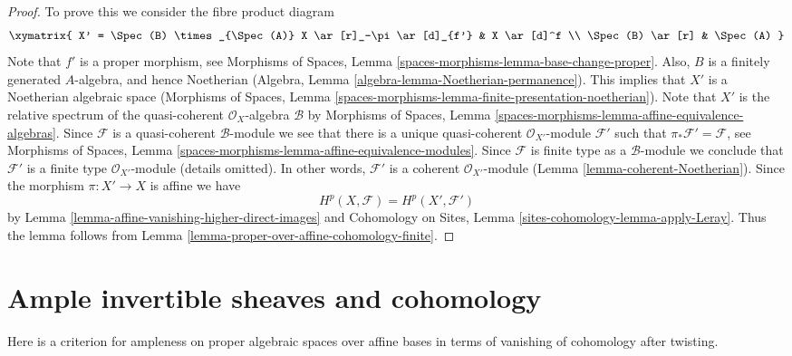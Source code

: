 \begin{proof}
To prove this we consider the fibre product diagram
$$
\xymatrix{
X' = \Spec(B) \times_{\Spec(A)} X
\ar[r]_-\pi \ar[d]_{f'} &
X \ar[d]^f \\
\Spec(B) \ar[r] &
\Spec(A)
}
$$
Note that $f'$ is a proper morphism, see
Morphisms of Spaces, Lemma \ref{spaces-morphisms-lemma-base-change-proper}.
Also, $B$ is a finitely generated $A$-algebra, and hence
Noetherian (Algebra, Lemma \ref{algebra-lemma-Noetherian-permanence}).
This implies that $X'$ is a Noetherian algebraic space
(Morphisms of Spaces, Lemma
\ref{spaces-morphisms-lemma-finite-presentation-noetherian}).
Note that $X'$ is the relative spectrum of the quasi-coherent
$\mathcal{O}_X$-algebra $\mathcal{B}$ by
Morphisms of Spaces, Lemma
\ref{spaces-morphisms-lemma-affine-equivalence-algebras}.
Since $\mathcal{F}$ is a quasi-coherent $\mathcal{B}$-module
we see that there is a unique quasi-coherent
$\mathcal{O}_{X'}$-module $\mathcal{F}'$ such that
$\pi_*\mathcal{F}' = \mathcal{F}$, see
Morphisms of Spaces, Lemma
\ref{spaces-morphisms-lemma-affine-equivalence-modules}.
Since $\mathcal{F}$ is finite type as a $\mathcal{B}$-module we
conclude that $\mathcal{F}'$ is a finite type
$\mathcal{O}_{X'}$-module (details omitted). In other words,
$\mathcal{F}'$ is a coherent $\mathcal{O}_{X'}$-module
(Lemma \ref{lemma-coherent-Noetherian}).
Since the morphism $\pi : X' \to X$ is affine we have
$$
H^p(X, \mathcal{F}) = H^p(X', \mathcal{F}')
$$
by
Lemma \ref{lemma-affine-vanishing-higher-direct-images}
and
Cohomology on Sites, Lemma \ref{sites-cohomology-lemma-apply-Leray}.
Thus the lemma follows from
Lemma \ref{lemma-proper-over-affine-cohomology-finite}.
\end{proof}









\section{Ample invertible sheaves and cohomology}
\label{section-ample-cohomology}

\noindent
Here is a criterion for ampleness on proper algebraic spaces over affine bases
in terms of vanishing of cohomology after twisting.

